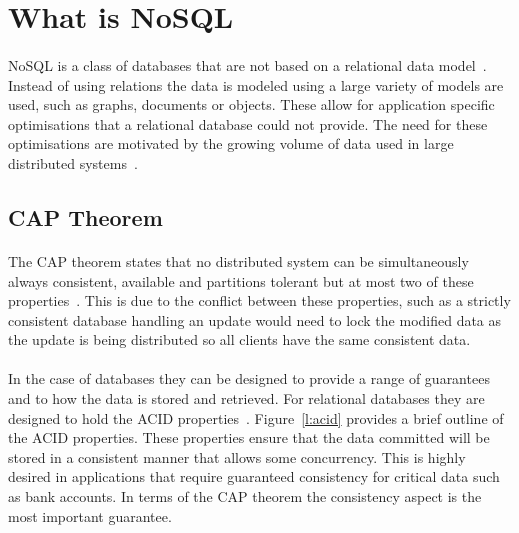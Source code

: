 \documentclass{CRPITStyle}
\renewcommand{\cite}{\citep}
\begin{document}
\section{What is NoSQL}

\paragraph{}
NoSQL is a class of databases that are not based on
a relational data model~\cite{nosql_db,nosql_survey}.
Instead of using relations the data is modeled using a large
variety of models are used, such as graphs, documents or objects.
These allow for application specific optimisations that
a relational database could not provide.
The need for these optimisations are motivated by the growing
volume of data used in large distributed systems~\cite{nosql_db,nosql_survey}.

\subsection{CAP Theorem}

\paragraph{}
The CAP theorem states that no distributed system can be
simultaneously always consistent, available and
partitions tolerant but at most two of these properties~\cite{base,nosql_db,compare_nosql,nosql_survey}.
This is due to the conflict between these properties, such as a
strictly consistent database handling an update would
need to lock the modified data as the update is being distributed
so all clients have the same consistent data.


\paragraph{}
In the case of databases they can be designed to provide a
range of guarantees and to how the data is stored and retrieved.
For relational databases they are designed to hold
the ACID properties~\cite{relational_db,base}.
Figure~\ref{l:acid} provides a brief outline of the ACID properties.
These properties ensure that the data committed will be stored in a
consistent manner that allows some concurrency.
This is highly desired in applications that require guaranteed consistency
for critical data such as bank accounts.
In terms of the CAP theorem the consistency aspect is the most important
guarantee.
\end{document}
